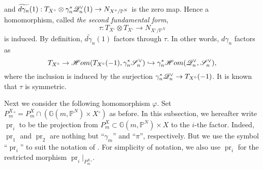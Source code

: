 \documentclass[a4paper,12pt]{amsart}
\theoremstyle{plain}
\theoremstyle{definition}
\begin{document}
and
$\widetilde{d{\gamma_n}}(1): T_{X{^\circ}} \otimes \gamma_n^*{\mathscr{Q}}_{n}\spcheck(1) \rightarrow N_{{X{^\circ}}/{\mathbb{P}}^N}$
is the zero map. 
Hence a homomorphism, called \emph{the second fundamental form},
\[
\tau: T_{X{^\circ}} \otimes T_{X{^\circ}} \rightarrow  N_{{X{^\circ}}/{\mathbb{P}}^N}
\]
is induced.
By definition, $\widetilde{d{\gamma_n}}(1)$ factors through $\tau$.
In other words,
$d \gamma_n $ factors as
\[
T_{X{^\circ}} \rightarrow  {\mathscr{H}om}( T_{X{^\circ}}(-1) ,  \gamma_n^* {\mathscr{S}}_{n}\spcheck ) \hookrightarrow  \gamma_n^*{\mathscr{H}om}({\mathscr{Q}}_{n}\spcheck, {\mathscr{S}}_{n}\spcheck),
\]
where the inclusion is induced by the surjection $\gamma_n^*{\mathscr{Q}}_{n}\spcheck \rightarrow T_{X{^\circ}}(-1) $.
It is known that $\tau$
is symmetric.

\vspace{2mm}
Next we consider the following homomorphism ${\varphi}$.
Set ${{P_m^{X}}{^\circ}} = {P_m^{X}} \cap ({{\mathbb{G}}(m,{{\mathbb{P}}^N})} \times {X{^\circ}})$ as before.
In this subsection, we hereafter write $\operatorname{pr}_i$
to be the projection from
$P_m^X \subset {{\mathbb{G}}(m,{{\mathbb{P}}^N})} \times X$ to the $i$-the factor.
Indeed, $\operatorname{pr}_1$ and $\operatorname{pr}_2$ are nothing but
``$\gamma_m$'' and ``$\pi$'', respectively.
But we use the symbol ``$\operatorname{pr}_i$'' to suit the notation of \cite{FI}.
For simplicity of notation,
we also use $\operatorname{pr}_i$ for the restricted morphism
$\operatorname{pr}_i|_{{P_m^{X}}{^\circ}}$.
\end{document}
